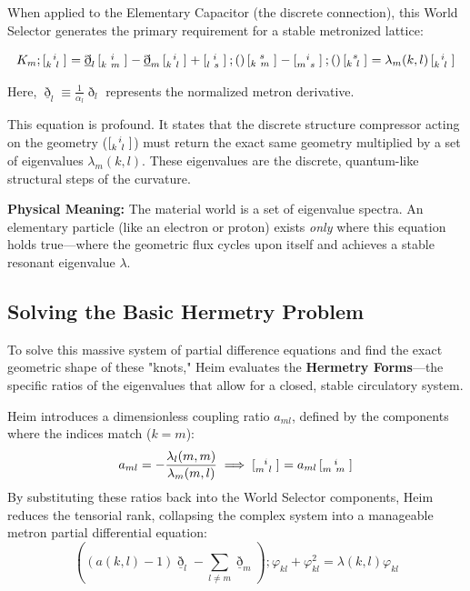 \documentclass[11pt,a4paper,oneside]{article}
\newcommand{\ethop}{\eth}
\newcommand{\metroncap}[4][]{%
    \left[ \renewcommand{\arraystretch}{0.85} \substack{#2 \\ #3 \ #4} \right]_{#1}%
}
\begin{document}
When applied to the Elementary Capacitor (the discrete connection), this World Selector generates the primary requirement for a stable metronized lattice:
\begin{tcolorbox}[colback=white, colframe=theoryred, title=\textbf{The World Selector Eigenvalue Equation}]
\begin{equation}
    K_m; \metroncap{i}{k\ l}{ } = \underline{\ethop}_l \metroncap{i}{k\ m}{ } - \underline{\ethop}_m \metroncap{i}{k\ l}{ } + \metroncap{i}{l\ s}{ }; () \metroncap{s}{k\ m}{ } - \metroncap{i}{m\ s}{ }; () \metroncap{s}{k\ l}{ } = \lambda_m(k, l) \metroncap{i}{k\ l}{ }
\end{equation}
\end{tcolorbox}
Here, $\underline{\ethop}_l \equiv \frac{1}{\alpha_l}\ethop_l$ represents the normalized metron derivative. 

This equation is profound. It states that the discrete structure compressor acting on the geometry ($\metroncap{i}{k\ l}{ }$) must return the exact same geometry multiplied by a set of eigenvalues $\lambda_m(k, l)$. These eigenvalues are the discrete, quantum-like structural steps of the curvature. 

\textbf{Physical Meaning:} The material world is a set of eigenvalue spectra. An elementary particle (like an electron or proton) exists \textit{only} where this equation holds true—where the geometric flux cycles upon itself and achieves a stable resonant eigenvalue $\lambda$. 

\subsection{Solving the Basic Hermetry Problem}

To solve this massive system of partial difference equations and find the exact geometric shape of these "knots," Heim evaluates the \textbf{Hermetry Forms}—the specific ratios of the eigenvalues that allow for a closed, stable circulatory system.

Heim introduces a dimensionless coupling ratio $a_{ml}$, defined by the components where the indices match ($k=m$):
\begin{equation}
    a_{ml} = -\frac{\lambda_l(m, m)}{\lambda_m(m, l)} \implies \metroncap{i}{m\ l}{ } = a_{ml} \metroncap{i}{m\ m}{ }
\end{equation}
By substituting these ratios back into the World Selector components, Heim reduces the tensorial rank, collapsing the complex system into a manageable metron partial differential equation:
\begin{equation}
    \left( (a(k, l)-1)\underline{\ethop}_l - \sum_{l \neq m} \underline{\ethop}_m \right); \varphi_{kl} + \varphi_{kl}^2 = \lambda(k, l)\varphi_{kl}
\end{equation}
\end{document}
